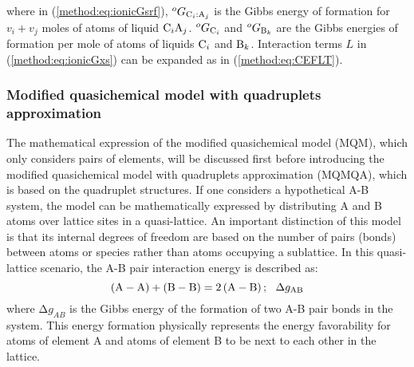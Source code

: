 where in (\ref{method:eq:ionicGsrf}), $^{o}G_{{\rm C}_i:{\rm A}_j}$ is the Gibbs energy of formation for $v_i+v_j$ moles of atoms of liquid ${\rm C}_i{\rm A}_j$. $^{o}G_{{\rm C}_i}$ and $^{o}G_{{\rm B}_k}$ are the Gibbs energies of formation per mole of atoms of liquids ${\rm C}_i$ and ${\rm B}_k$. Interaction terms $L$ in (\ref{method:eq:ionicGxs}) can be expanded as in (\ref{method:eq:CEFLT}).

\subsubsection{Modified quasichemical model with quadruplets approximation} \label{method:ssec:mqmqa}
The mathematical expression of the modified quasichemical model (MQM), which only considers pairs of elements, will be discussed first before introducing the modified quasichemical model with quadruplets approximation (MQMQA), which is based on the quadruplet structures. If one considers a hypothetical A-B system, the model can be mathematically expressed by distributing A and B atoms over lattice sites in a quasi-lattice. An important distinction of this model is that its internal degrees of freedom are based on the number of pairs (bonds) between atoms or species rather than atoms occupying a sublattice. In this quasi-lattice scenario, the A-B pair interaction energy is described as:
\begin{equation} \label{method:eq:mqmpair}
    \left({\rm A-A}\right)+\left({\rm B-B}\right)=2\left({\rm A-B}\right);\:\:\:\mathrm{\Delta}g_{\rm AB}
\end{equation}
where $\mathrm{\Delta}g_{AB}$ is the Gibbs energy of the formation of two A-B pair bonds in the system. This energy formation physically represents the energy favorability for atoms of element A and atoms of element B to be next to each other in the lattice. 

